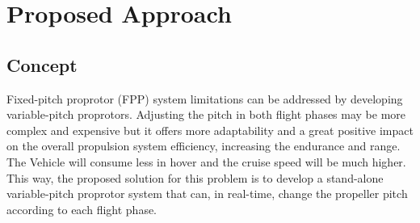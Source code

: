 \chapter{Proposed Approach}
\label{chap:Chapter4}

\section{Concept}
Fixed-pitch proprotor (FPP) system limitations can be addressed by developing variable-pitch proprotors.
Adjusting the pitch in both flight phases may be more complex and expensive but it offers more adaptability and a great positive impact on the overall propulsion system efficiency, increasing the endurance and range.
The Vehicle will consume less in hover and the cruise speed will be much higher.\\

This way, the proposed solution for this problem is to develop a stand-alone variable-pitch proprotor system that can, in real-time, change the propeller pitch according to each flight phase.


